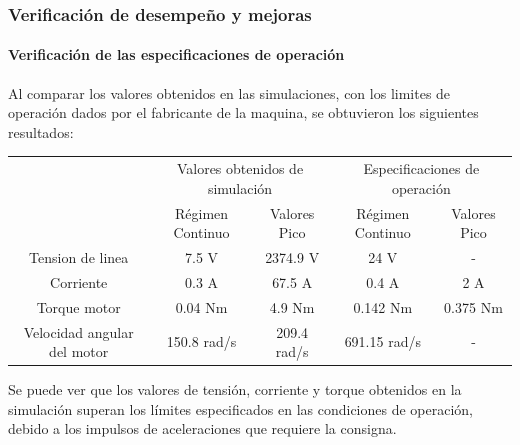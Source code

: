 \documentclass[a4paper, 10pt, onecolumn,journal]{ieeeconf}
\begin{document}
\subsubsection{\textbf{Verificación de desempeño y mejoras}}
\paragraph{\textbf{Verificación de las especificaciones de operación}}Al comparar los valores obtenidos en las simulaciones, con los limites de operación dados por el fabricante de la maquina, se obtuvieron los siguientes resultados:

\begin{table}[H]
	\centering
	\begin{tabular}{|c|cc|cc|}
		\hline
		\multirow{2}{*}{} & \multicolumn{2}{c|}{Valores obtenidos de simulación} & \multicolumn{2}{c|}{Especificaciones de operación}   \\ \cline{2-5} 
		& \multicolumn{1}{c|}{Régimen Continuo} & Valores Pico & \multicolumn{1}{c|}{Régimen Continuo} & Valores Pico \\ \hline
		Tension de linea         & \multicolumn{1}{c|}{7.5 V}                & 2374.9 V            & \multicolumn{1}{c|}{24 V}                & -            \\ \hline
		Corriente         & \multicolumn{1}{c|}{0.3 A}                & 67.5 A            & \multicolumn{1}{c|}{0.4 A}                & 2 A            \\ \hline
		Torque motor            & \multicolumn{1}{c|}{0.04 Nm}                & 4.9 Nm            & \multicolumn{1}{c|}{0.142 Nm}               & 0.375 Nm           \\ \hline
		Velocidad angular del motor         & \multicolumn{1}{c|}{150.8 rad/s}               & 209.4 rad/s           & \multicolumn{1}{c|}{691.15 rad/s }               & -           \\ \hline
	\end{tabular}
\end{table}

Se puede ver que los valores de tensión, corriente y torque obtenidos en la simulación superan los límites especificados en las condiciones de operación, debido a los impulsos de aceleraciones que requiere la consigna. 
\end{document}
